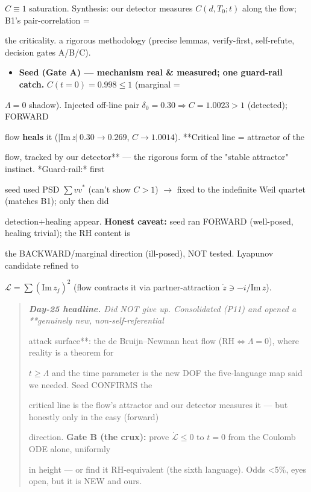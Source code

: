 \documentclass[10pt]{article}
\begin{document}
  $C\equiv1$ saturation. Synthesis: our detector measures $C(d,T_0;t)$ along the flow; B1's pair-correlation =\par
  the criticality. a rigorous methodology (precise lemmas, verify-first, self-refute, decision gates A/B/C).\par
\begin{itemize}
\item \textbf{Seed (Gate A) --- mechanism real \& measured; one guard-rail catch.} $C(t{=}0)=0.998\le1$ (marginal =
\end{itemize}
  $\Lambda{=}0$ shadow). Injected off-line pair $\delta_0{=}0.30\Rightarrow C{=}1.0023{>}1$ (detected); FORWARD\par
  flow \textbf{heals} it ($|\mathrm{Im}\,z|\,0.30\!\to\!0.269$, $C\to1.0014$). **Critical line = attractor of the\par
  flow, tracked by our detector** --- the rigorous form of the "stable attractor" instinct. *Guard-rail:* first\par
  seed used PSD $\sum vv^*$ (can't show $C>1$) \ensuremath{\to} fixed to the indefinite Weil quartet (matches B1); only then did\par
  detection+healing appear. \textbf{Honest caveat:} seed ran FORWARD (well-posed, healing trivial); the RH content is\par
  the BACKWARD/marginal direction (ill-posed), NOT tested. Lyapunov candidate refined to\par
  $\mathcal L=\sum(\mathrm{Im}\,z_j)^2$ (flow contracts it via partner-attraction $\dot z\ni-i/\mathrm{Im}\,z$).\par

\begin{quote}\itshape
\textbf{Day-25 headline.} Did NOT give up. Consolidated (P11) and opened a **genuinely new, non-self-referential\par
attack surface**: the de Bruijn--Newman heat flow ($\mathrm{RH}\iff\Lambda=0$), where reality is a theorem for\par
$t\ge\Lambda$ and the time parameter is the new DOF the five-language map said we needed. Seed CONFIRMS the\par
critical line is the flow's attractor and our detector measures it --- but honestly only in the easy (forward)\par
direction. \textbf{Gate B (the crux):} prove $\dot{\mathcal L}\le0$ to $t=0$ from the Coulomb ODE alone, uniformly\par
in height --- or find it RH-equivalent (the sixth language). Odds <5\%, eyes open, but it is NEW and ours.\par
\end{quote}
\end{document}
